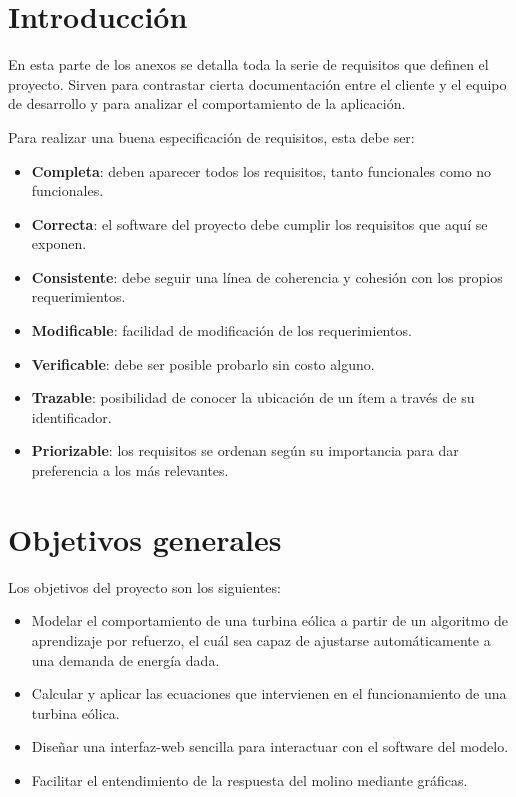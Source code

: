 
\section{Introducción}

En esta parte de los anexos se detalla toda la serie de requisitos que definen el proyecto. Sirven para contrastar cierta documentación entre el cliente y el equipo de desarrollo y para analizar el comportamiento de la aplicación.

Para realizar una buena especificación de requisitos, esta debe ser:
\begin{itemize}
    \item \textbf{Completa}: deben aparecer todos los requisitos, tanto funcionales como no funcionales.
    \item \textbf{Correcta}: el software del proyecto debe cumplir los requisitos que aquí se exponen.
    \item \textbf{Consistente}: debe seguir una línea de coherencia y cohesión con los propios requerimientos.
    \item \textbf{Modificable}: facilidad de modificación de los requerimientos.
    \item \textbf{Verificable}: debe ser posible probarlo sin costo alguno.
    \item \textbf{Trazable}: posibilidad de conocer la ubicación de un ítem a través de su identificador.
    \item \textbf{Priorizable}: los requisitos se ordenan según su importancia para dar preferencia a los más relevantes.
\end{itemize}


\section{Objetivos generales}

Los objetivos del proyecto son los siguientes:
\begin{itemize}
    \item Modelar el comportamiento de una turbina eólica a partir de un algoritmo de aprendizaje por refuerzo, el cuál sea capaz de ajustarse automáticamente a una demanda de energía dada.
    \item Calcular y aplicar las ecuaciones que intervienen en el funcionamiento de una turbina eólica.
    \item Diseñar una interfaz-web sencilla para interactuar con el software del modelo.
    \item Facilitar el entendimiento de la respuesta del molino mediante gráficas.
\end{itemize}


